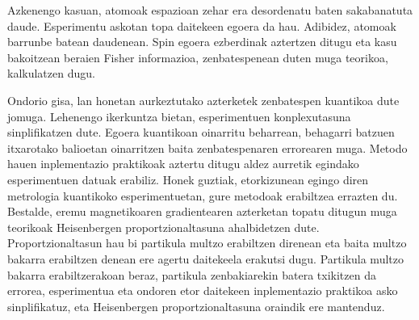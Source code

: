 Azkenengo kasuan, atomoak espazioan zehar era desordenatu baten sakabanatuta daude.
Esperimentu askotan topa daitekeen egoera da hau.
Adibidez, atomoak barrunbe batean daudenean.
Spin egoera ezberdinak aztertzen ditugu eta kasu bakoitzean beraien Fisher informazioa, zenbatespenean duten muga teorikoa, kalkulatzen dugu.

Ondorio gisa, lan honetan aurkeztutako azterketek zenbatespen kuantikoa dute jomuga.
Lehenengo ikerkuntza bietan, esperimentuen konplexutasuna sinplifikatzen dute. Egoera kuantikoan oinarritu beharrean, behagarri batzuen itxarotako balioetan oinarritzen baita zenbatespenaren errorearen muga.
Metodo hauen inplementazio praktikoak aztertu ditugu aldez aurretik egindako esperimentuen datuak erabiliz.
Honek guztiak, etorkizunean egingo diren metrologia kuantikoko esperimentuetan, gure metodoak erabiltzea errazten du.
Bestalde, eremu magnetikoaren gradientearen azterketan topatu ditugun muga teorikoak Heisenbergen proportzionaltasuna ahalbidetzen dute.
Proportzionaltasun hau bi partikula multzo erabiltzen direnean eta baita multzo bakarra erabiltzen denean ere agertu daitekeela erakutsi dugu.
Partikula multzo bakarra erabiltzerakoan beraz, partikula zenbakiarekin batera txikitzen da errorea, esperimentua eta ondoren etor daitekeen inplementazio praktikoa asko sinplifikatuz, eta Heisenbergen proportzionaltasuna oraindik ere mantenduz.
